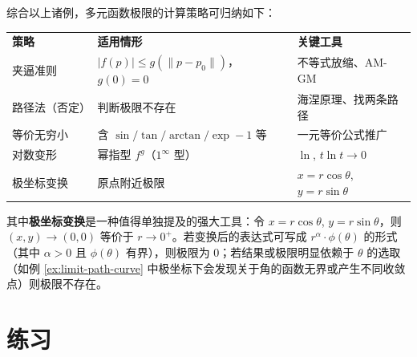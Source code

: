 \documentclass[lang=cn,11pt]{elegantbook}
\begin{document}
\begin{remark}[求极限的策略总结]
综合以上诸例，多元函数极限的计算策略可归纳如下：
\begin{center}
\renewcommand{\arraystretch}{1.3}
\begin{tabular}{@{}lll@{}}
\textbf{策略}&\textbf{适用情形}&\textbf{关键工具}\\[2pt]
夹逼准则 & $|f(p)|\leqslant  g(\|p-p_0\|)$，$g(0)=0$ & 不等式放缩、AM-GM\\[2pt]
路径法（否定） & 判断极限不存在 & 海涅原理、找两条路径\\[2pt]
等价无穷小 & 含 $\sin/\tan/\arctan/\exp-1$ 等 & 一元等价公式推广\\[2pt]
对数变形 & 幂指型 $f^g$（$1^\infty$ 型） & $\ln$, $t\ln t\to 0$\\[2pt]
极坐标变换 & 原点附近极限 & $x=r\cos\theta$, $y=r\sin\theta$
\end{tabular}
\end{center}

其中\textbf{极坐标变换}是一种值得单独提及的强大工具：令 $x=r\cos\theta$, $y=r\sin\theta$，则 $(x,y)\to(0,0)$ 等价于 $r\to 0^+$。若变换后的表达式可写成 $r^\alpha\cdot\phi(\theta)$ 的形式（其中 $\alpha>0$ 且 $\phi(\theta)$ 有界），则极限为 0；若结果或极限明显依赖于 $\theta$ 的选取（如例 \ref{ex:limit-path-curve} 中极坐标下会发现关于角的函数无界或产生不同收敛点）则极限不存在。
\end{remark}


\section{练习}
\end{document}
